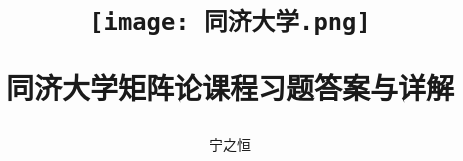 \def\myTitle{同济大学矩阵论课程习题答案与详解}
\def\myAuthor{宁之恒}
% 


\title{
    \begin{figure}[!h]
        \centering
        \texttt{[image: 同济大学.png]}
        \label{同济大学}
    \end{figure}

    {\Huge{\textbf{\myTitle}}}}
\author{\myAuthor}
\date{}
\maketitle




